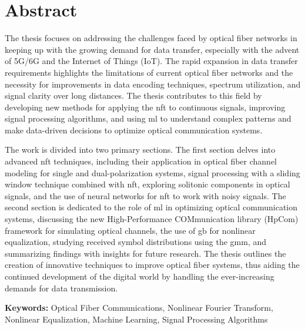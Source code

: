 

\cleardoublepage
\chapter*{Abstract}
The thesis focuses on addressing the challenges faced by optical fiber networks in keeping up with the growing demand for data transfer, especially with the advent of 5G/6G and the Internet of Things (IoT). The rapid expansion in data transfer requirements highlights the limitations of current optical fiber networks and the necessity for improvements in data encoding techniques, spectrum utilization, and signal clarity over long distances. The thesis contributes to this field by developing new methods for applying the \acrfull{nft} to continuous signals, improving signal processing algorithms, and using \acrfull{ml} to understand complex patterns and make data-driven decisions to optimize optical communication systems.

The work is divided into two primary sections. The first section delves into advanced \acrshort{nft} techniques, including their application in optical fiber channel modeling for single and dual-polarization systems, signal processing with a sliding window technique combined with \acrshort{nft}, exploring solitonic components in optical signals, and the use of neural networks for \acrshort{nft} to work with noisy signals. The second section is dedicated to the role of \acrshort{ml} in optimizing optical communication systems, discussing the new High-Performance COMmunication library (HpCom) framework for simulating optical channels, the use of \acrlong{gb} for nonlinear equalization, studying received symbol distributions using the \acrlong{gmm}, and summarizing findings with insights for future research. The thesis outlines the creation of innovative techniques to improve optical fiber systems, thus aiding the continued development of the digital world by handling the ever-increasing demands for data transmission.

\vfill

\textbf{Keywords:} Optical Fiber Communications, Nonlinear Fourier Transform, Nonlinear Equalization, Machine Learning, Signal Processing Algorithms


